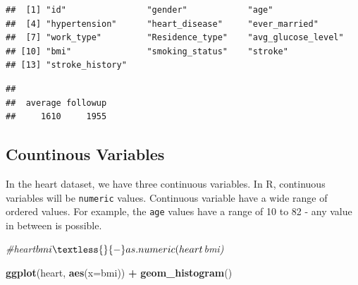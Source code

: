 \documentclass[
]{book}
\newenvironment{Shaded}{\begin{snugshade}}{\end{snugshade}}
\newcommand{\AttributeTok}[1]{\textcolor[rgb]{0.13,0.29,0.53}{#1}}
\newcommand{\CommentTok}[1]{\textcolor[rgb]{0.56,0.35,0.01}{\textit{#1}}}
\newcommand{\ConstantTok}[1]{\textcolor[rgb]{0.56,0.35,0.01}{#1}}
\newcommand{\ControlFlowTok}[1]{\textcolor[rgb]{0.13,0.29,0.53}{\textbf{#1}}}
\newcommand{\DecValTok}[1]{\textcolor[rgb]{0.00,0.00,0.81}{#1}}
\newcommand{\FunctionTok}[1]{\textcolor[rgb]{0.13,0.29,0.53}{\textbf{#1}}}
\newcommand{\NormalTok}[1]{#1}
\newcommand{\OtherTok}[1]{\textcolor[rgb]{0.56,0.35,0.01}{#1}}
\newcommand{\SpecialCharTok}[1]{\textcolor[rgb]{0.81,0.36,0.00}{\textbf{#1}}}
\newcommand{\StringTok}[1]{\textcolor[rgb]{0.31,0.60,0.02}{#1}}
\begin{document}
\begin{verbatim}
##  [1] "id"                "gender"            "age"              
##  [4] "hypertension"      "heart_disease"     "ever_married"     
##  [7] "work_type"         "Residence_type"    "avg_glucose_level"
## [10] "bmi"               "smoking_status"    "stroke"           
## [13] "stroke_history"
\end{verbatim}

\begin{Shaded}
\end{Shaded}

\begin{verbatim}
## 
##  average followup 
##     1610     1955
\end{verbatim}

\subsection{Countinous Variables}\label{countinous-variables}

In the heart dataset, we have three continuous variables. In R, continuous variables will be \texttt{numeric} values. Continuous variable have a wide range of ordered values. For example, the \texttt{age} values have a range of 10 to 82 - any value in between is possible.

\begin{Shaded}
\begin{Highlighting}[]
\CommentTok{\#heart$bmi \textless{}{-} as.numeric(heart$bmi)}

\FunctionTok{ggplot}\NormalTok{(heart, }\FunctionTok{aes}\NormalTok{(}\AttributeTok{x=}\NormalTok{bmi)) }\SpecialCharTok{+} 
  \FunctionTok{geom\_histogram}\NormalTok{()}
\end{Highlighting}
\end{Shaded}
\end{document}
